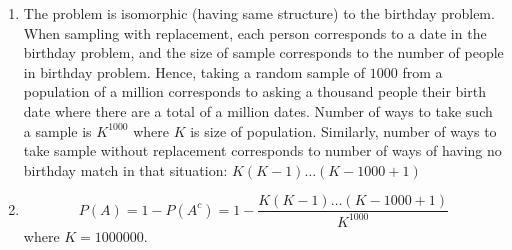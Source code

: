 \begin{enumerate}[label=(\alph*)]
\item  The problem is isomorphic (having same structure) to the birthday
problem. When sampling with replacement, each person corresponds to 
a date in the birthday problem, and the size of sample corresponds to
the number of people in birthday problem. Hence, taking a random
sample of $1000$ from a population of a million corresponds to asking
a thousand people their birth date where there are a total of a million
dates. Number of ways to take such a sample is $K^{1000}$ where $K$ is
size of population.
Similarly, number of ways to take sample without replacement corresponds
to number of ways of having no birthday match in that situation:
$K(K-1) \dots (K-1000+1)$

\item $$P(A) = 1 - P(A^{c}) = 1 - \frac{K(K-1) \dots (K-1000+1)}{K^{1000}}$$ 
where $K = 1000000$.
\end{enumerate}